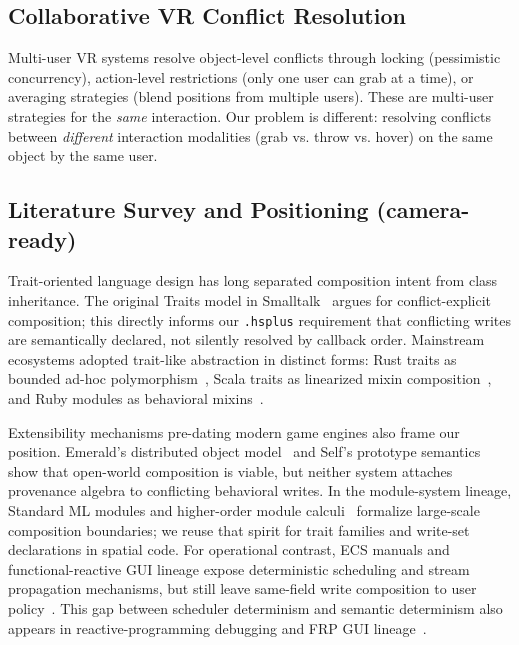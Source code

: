 \documentclass[sigconf,nonacm]{acmart}
\newcommand{\hsplus}{\texttt{.hsplus}}
\begin{document}
\subsection{Collaborative VR Conflict Resolution}
Multi-user VR systems resolve object-level conflicts through
locking (pessimistic concurrency), action-level restrictions
(only one user can grab at a time), or averaging strategies
(blend positions from multiple users). These are multi-user
strategies for the \emph{same} interaction. Our problem is
different: resolving conflicts between \emph{different}
interaction modalities (grab vs. throw vs. hover) on the
same object by the same user.

\subsection{Literature Survey and Positioning (camera-ready)}
\label{sec:related:survey}
Trait-oriented language design has long separated composition intent from
class inheritance. The original Traits model in Smalltalk~\cite{scharli2003traits,ducasse2006traits}
argues for conflict-explicit composition; this directly informs our
\hsplus{} requirement that conflicting writes are semantically declared,
not silently resolved by callback order. Mainstream ecosystems adopted
trait-like abstraction in distinct forms: Rust traits as bounded ad-hoc
polymorphism~\cite{rustbook2019}, Scala traits as linearized mixin
composition~\cite{odersky2004scala}, and Ruby modules as behavioral mixins~\cite{thomas2004ruby}.

Extensibility mechanisms pre-dating modern game engines also frame our
position. Emerald's distributed object model~\cite{black1987emerald} and
Self's prototype semantics~\cite{ungar1987self} show that open-world
composition is viable, but neither system attaches provenance algebra to
conflicting behavioral writes. In the module-system lineage, Standard ML
modules and higher-order module calculi~\cite{macqueen1984modules,harper1994hml}
formalize large-scale composition boundaries; we reuse that spirit for
trait families and write-set declarations in spatial code.
For operational contrast, ECS manuals and functional-reactive GUI lineage
expose deterministic scheduling and stream propagation mechanisms, but still
leave same-field write composition to user policy~\cite{bevy-ecs2024,unity-dots2024,flecs-ecs2023}.
This gap between scheduler determinism and semantic determinism also appears in
reactive-programming debugging and FRP GUI lineage~\cite{salvaneschi-reactive2018,frp-elm2012}.
\end{document}
